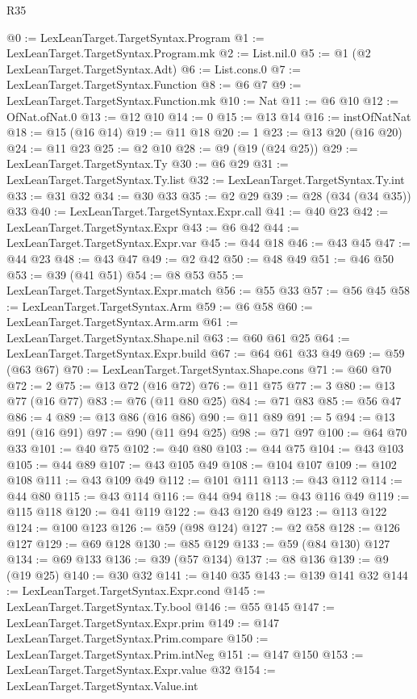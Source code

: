 \begin{lexlean}{R35}
\begin{coremodule}
@0 := LexLeanTarget.TargetSyntax.Program
@1 := LexLeanTarget.TargetSyntax.Program.mk
@2 := List.nil.{0}
@5 := @1 (@2 LexLeanTarget.TargetSyntax.Adt)
@6 := List.cons.{0}
@7 := LexLeanTarget.TargetSyntax.Function
@8 := @6 @7
@9 := LexLeanTarget.TargetSyntax.Function.mk
@10 := Nat
@11 := @6 @10
@12 := OfNat.ofNat.{0}
@13 := @12 @10
@14 := 0
@15 := @13 @14
@16 := instOfNatNat
@18 := @15 (@16 @14)
@19 := @11 @18
@20 := 1
@23 := @13 @20 (@16 @20)
@24 := @11 @23
@25 := @2 @10
@28 := @9 (@19 (@24 @25))
@29 := LexLeanTarget.TargetSyntax.Ty
@30 := @6 @29
@31 := LexLeanTarget.TargetSyntax.Ty.list
@32 := LexLeanTarget.TargetSyntax.Ty.int
@33 := @31 @32
@34 := @30 @33
@35 := @2 @29
@39 := @28 (@34 (@34 @35)) @33
@40 := LexLeanTarget.TargetSyntax.Expr.call
@41 := @40 @23
@42 := LexLeanTarget.TargetSyntax.Expr
@43 := @6 @42
@44 := LexLeanTarget.TargetSyntax.Expr.var
@45 := @44 @18
@46 := @43 @45
@47 := @44 @23
@48 := @43 @47
@49 := @2 @42
@50 := @48 @49
@51 := @46 @50
@53 := @39 (@41 @51)
@54 := @8 @53
@55 := LexLeanTarget.TargetSyntax.Expr.match
@56 := @55 @33
@57 := @56 @45
@58 := LexLeanTarget.TargetSyntax.Arm
@59 := @6 @58
@60 := LexLeanTarget.TargetSyntax.Arm.arm
@61 := LexLeanTarget.TargetSyntax.Shape.nil
@63 := @60 @61 @25
@64 := LexLeanTarget.TargetSyntax.Expr.build
@67 := @64 @61 @33 @49
@69 := @59 (@63 @67)
@70 := LexLeanTarget.TargetSyntax.Shape.cons
@71 := @60 @70
@72 := 2
@75 := @13 @72 (@16 @72)
@76 := @11 @75
@77 := 3
@80 := @13 @77 (@16 @77)
@83 := @76 (@11 @80 @25)
@84 := @71 @83
@85 := @56 @47
@86 := 4
@89 := @13 @86 (@16 @86)
@90 := @11 @89
@91 := 5
@94 := @13 @91 (@16 @91)
@97 := @90 (@11 @94 @25)
@98 := @71 @97
@100 := @64 @70 @33
@101 := @40 @75
@102 := @40 @80
@103 := @44 @75
@104 := @43 @103
@105 := @44 @89
@107 := @43 @105 @49
@108 := @104 @107
@109 := @102 @108
@111 := @43 @109 @49
@112 := @101 @111
@113 := @43 @112
@114 := @44 @80
@115 := @43 @114
@116 := @44 @94
@118 := @43 @116 @49
@119 := @115 @118
@120 := @41 @119
@122 := @43 @120 @49
@123 := @113 @122
@124 := @100 @123
@126 := @59 (@98 @124)
@127 := @2 @58
@128 := @126 @127
@129 := @69 @128
@130 := @85 @129
@133 := @59 (@84 @130) @127
@134 := @69 @133
@136 := @39 (@57 @134)
@137 := @8 @136
@139 := @9 (@19 @25)
@140 := @30 @32
@141 := @140 @35
@143 := @139 @141 @32
@144 := LexLeanTarget.TargetSyntax.Expr.cond
@145 := LexLeanTarget.TargetSyntax.Ty.bool
@146 := @55 @145
@147 := LexLeanTarget.TargetSyntax.Expr.prim
@149 := @147 LexLeanTarget.TargetSyntax.Prim.compare
@150 := LexLeanTarget.TargetSyntax.Prim.intNeg
@151 := @147 @150
@153 := LexLeanTarget.TargetSyntax.Expr.value @32
@154 := LexLeanTarget.TargetSyntax.Value.int

\end{coremodule}
\end{lexlean}
